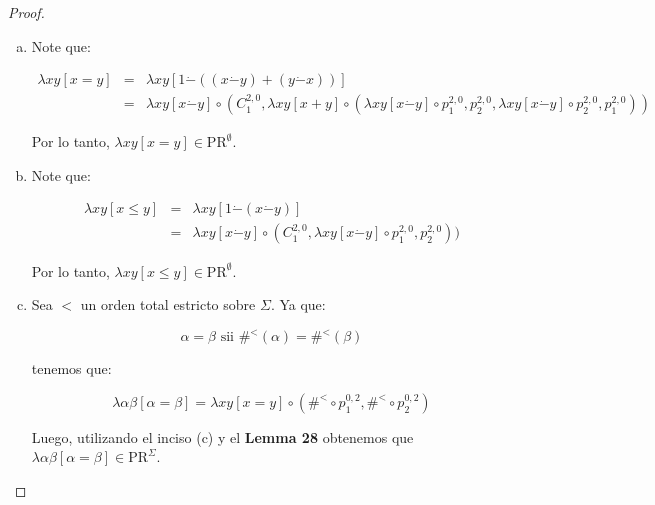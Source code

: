\begin{proof}
\begin{enumerate}[a)]
      \item Note que:

        \begin{eqnarray}
          \nonumber \lambda xy \left[x=y\right] &=& \lambda xy \left[1 \dot{-}((x \dot{-} y) + (y \dot{-} x))\right] \\
          \nonumber &=& \lambda xy \left[x \dot{-}y\right] \circ (C_{1}^{2,0}, \lambda xy \left[x+y\right] \circ
            (\lambda xy \left[x \dot{-}y\right] \circ p_{1}^{2,0}, p_{2}^{2,0}, \lambda xy \left[x \dot{-}y\right] \circ
            p_{2}^{2,0}, p_{1}^{2,0}))
        \end{eqnarray}

        \par Por lo tanto, $\lambda xy \left[x=y\right] \in \mathrm{PR}^{\emptyset}$.

      \item Note que:

        \begin{eqnarray}
          \nonumber \lambda xy \left[x \leq y\right] &=& \lambda xy\left[1 \dot{-}(x \dot{-}y)\right] \\
          \nonumber &=& \lambda xy \left[x \dot{-}y\right] \circ (C_{1}^{2,0}, \lambda xy \left[x \dot{-}y\right] \circ
            p_{1}^{2,0}, p_{2}^{2,0}))
        \end{eqnarray}

        \par Por lo tanto, $\lambda xy \left[x \leq y\right] \in \mathrm{PR}^{\emptyset}$.

      \item Sea $<$ un orden total estricto sobre $\Sigma$. Ya que:

        \[
          \alpha = \beta \text{ sii } \#^{<}(\alpha) = \#^{<}(\beta)
        \]

        \par tenemos que:

        \[
          \lambda \alpha\beta \left[\alpha=\beta\right] = \lambda xy \left[x=y\right] \circ (\#^{<} \circ p_{1}^{0,2},
          \#^{<} \circ p_{2}^{0,2})
        \]

        \par Luego, utilizando el inciso (c) y el \textbf{Lemma 28} obtenemos que $\lambda \alpha\beta
        \left[\alpha=\beta\right] \in \mathrm{PR}^{\Sigma}$.
    \end{enumerate}
  \end{proof}

